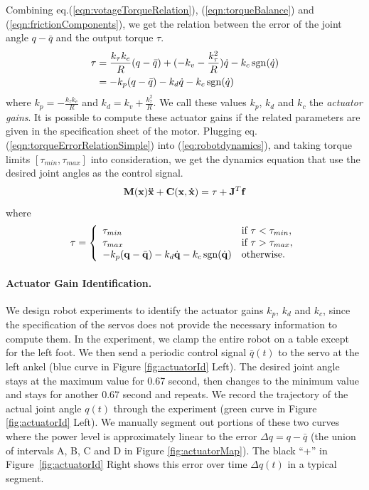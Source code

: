 Combining eq.(\ref{eqn:votageTorqueRelation}), (\ref{eqn:torqueBalance}) and (\ref{eqn:frictionComponents}), we get the relation between the error of the joint angle $q-\bar{q}$ and the output torque $\tau$.
\begin{align}
\nonumber  \tau & = \frac{k_{\tau}k_e}{R}(q-\bar{q})+(-k_v-\frac{k_{\tau}^2}{R})\dot{q}-k_c\operatorname{sgn}(\dot{q})\\
\nonumber & = -k_p(q-\bar{q}) - k_d\dot{q} - k_c\operatorname{sgn}(\dot{q})\\
  \label{eqn:torqueErrorRelationSimple}
\end{align}
where $k_p=-\frac{k_{\tau}k_e}{R}$ and $k_d=k_v+\frac{k_{\tau}^2}{R}$. We call these values $k_p$, $k_d$ and $k_c$ the \emph{actuator gains}. It is possible to compute these actuator gains if the related parameters are given in the specification sheet of the motor. Plugging eq.(\ref{eqn:torqueErrorRelationSimple}) into (\ref{eq:robotdynamics}), and taking torque limits $[\tau_{min}, \tau_{max}]$ into consideration, we get the dynamics equation that use the desired joint angles as the control signal.
\begin{displaymath}
 \mathbf{M}(\mathbf{x})\mathbf{\ddot{x}}+\mathbf{C}(\mathbf{x},\mathbf{\dot{x}}) = \tau+\mathbf{J}^T\mathbf{f} \\
  \end{displaymath}
where 
\begin{displaymath}\tau =
  \left\{
    \begin{array}{ll}
      \tau_{min} & \text{if }\tau < \tau_{min},\\
      \tau_{max} & \text{if }\tau > \tau_{max},\\
      -k_p(\mathbf{q}-\bar{\mathbf{q}}) - k_d\dot{\mathbf{q}} - k_c\operatorname{sgn}(\dot{\mathbf{q}}) & \text{otherwise.}\\
    \end{array}
  \right.
  \label{eqn:robotDynamicsControl}
\end{displaymath}

\paragraph{Actuator Gain Identification.} We design robot experiments to identify the actuator gains $k_p$, $k_d$ and $k_c$, since the specification of the servos does not provide the necessary information to compute them. In the experiment, we clamp the entire robot on a table except for the left foot. We then send a periodic control signal $\bar{q}(t)$ to the servo at the left ankel (blue curve in Figure \ref{fig:actuatorId} Left). The desired joint angle stays at the maximum value for 0.67 second, then changes to the minimum value and stays for another 0.67 second and repeats. We record the trajectory of the actual joint angle $q(t)$ through the experiment (green curve in Figure \ref{fig:actuatorId} Left). We manually segment out portions of these two curves where the power level is approximately linear to the error $\Delta q = q-\bar{q}$ (the union of intervals A, B, C and D in Figure \ref{fig:actuatorMap}). The black ``+'' in Figure~\ref{fig:actuatorId} Right shows this error over time $\Delta q(t)$ in a typical segment.


